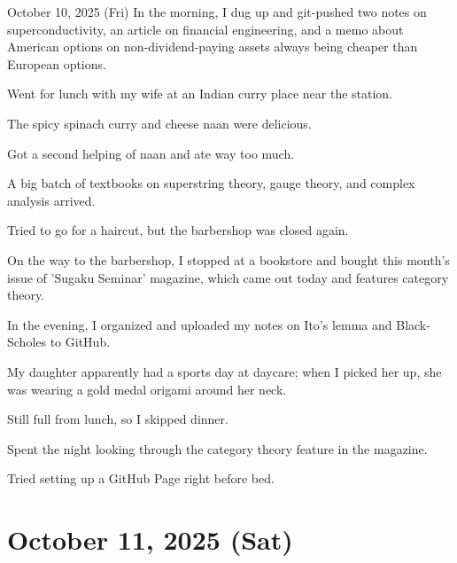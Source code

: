 \documentclass[dvipdfmx, autodetect-engine, aspectratio=169, 10.5pt]{beamer}
\begin{document}
\begin{frame}{October 10, 2025 (Fri)}
\scriptsize
In the morning, I dug up and git-pushed two notes on superconductivity, an article on financial engineering, and a memo about American options on non-dividend-paying assets always being cheaper than European options.

Went for lunch with my wife at an Indian curry place near the station.

The spicy spinach curry and cheese naan were delicious.

Got a second helping of naan and ate way too much.

A big batch of textbooks on superstring theory, gauge theory, and complex analysis arrived.

Tried to go for a haircut, but the barbershop was closed again.

On the way to the barbershop, I stopped at a bookstore and bought this month's issue of 'Sugaku Seminar' magazine, which came out today and features category theory.

In the evening, I organized and uploaded my notes on Ito's lemma and Black-Scholes to GitHub.

My daughter apparently had a sports day at daycare; when I picked her up, she was wearing a gold medal origami around her neck.

Still full from lunch, so I skipped dinner.

Spent the night looking through the category theory feature in the magazine.

Tried setting up a GitHub Page right before bed.
\end{frame}

\section{October 11, 2025 (Sat)}
\end{document}
